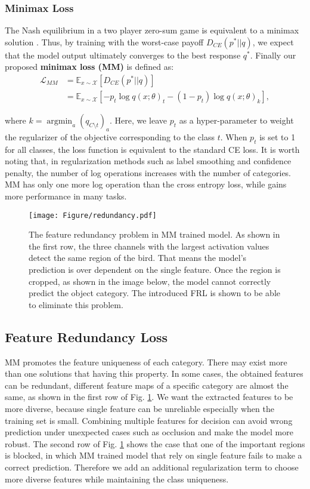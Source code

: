 \documentclass{article}
\theoremstyle{definition}
\begin{document}
\subsubsection{Minimax Loss}
The Nash equilibrium in a two player zero-sum game is equivalent to a minimax solution \cite{ferreira2012minimax}. Thus, by training with the worst-case payoff $D_{CE}(p^*||q)$, we expect that the model output ultimately converges to the best response $q^*$.
Finally our proposed \textbf{minimax loss (MM)} is defined as: 
\begin{align}\label{eq:MPP}
    \mathcal{L}_{MM} 
    &= \mathbb{E}_{x\sim\mathcal{X}}[ D_{CE}(p^*||q)]  \nonumber\\
    &= \mathbb{E}_{x\sim\mathcal{X}}[-p_t\log q(x;\theta)_t -(1-p_t)\log q(x;\theta)_k],
\end{align}

where $k =  {\mathop{\arg\min}_{a}} (q_{C\setminus t})_a$.
Here, we leave $p_t$ as a hyper-parameter to weight the regularizer of the objective corresponding to the class $t$. When $p_{t}$ is set to 1 for all classes, the loss function is equivalent to the standard CE loss. It is worth noting that, in regularization methods such as label smoothing and confidence penalty, the number of log operations increases with the number of categories. MM has only one more log operation than the cross entropy loss, while gains more performance in many tasks.

\begin{figure}[tb]
    \centering
    \texttt{[image: Figure/redundancy.pdf]}
    \caption{The feature redundancy problem in MM trained model. As shown in the first row, the three channels with the largest activation values detect the same region of the bird. That means the model's prediction is over dependent on the single feature. Once the region is cropped, as shown in the image below, the model cannot correctly predict the object category. The introduced FRL is shown to be able to eliminate this problem.}
    \label{fig:redundancy}
\end{figure}

\subsection{Feature Redundancy Loss}
MM promotes the feature uniqueness of each category. There may exist more than one solutions that having this property. In some cases, the obtained features can be redundant, different feature maps of a specific category are almost the same, as shown in the first row of Fig. \ref{fig:redundancy}. We want the extracted features to be more diverse, because single feature can be unreliable especially when the training set is small. Combining multiple features for decision can avoid wrong prediction under unexpected cases such as occlusion and make the model more robust. The second row of Fig. \ref{fig:redundancy} shows the case that one of the important regions is blocked, in which MM trained model that rely on single feature fails to make a correct prediction. Therefore we add an additional regularization term to choose more diverse features while maintaining the class uniqueness.
\end{document}

